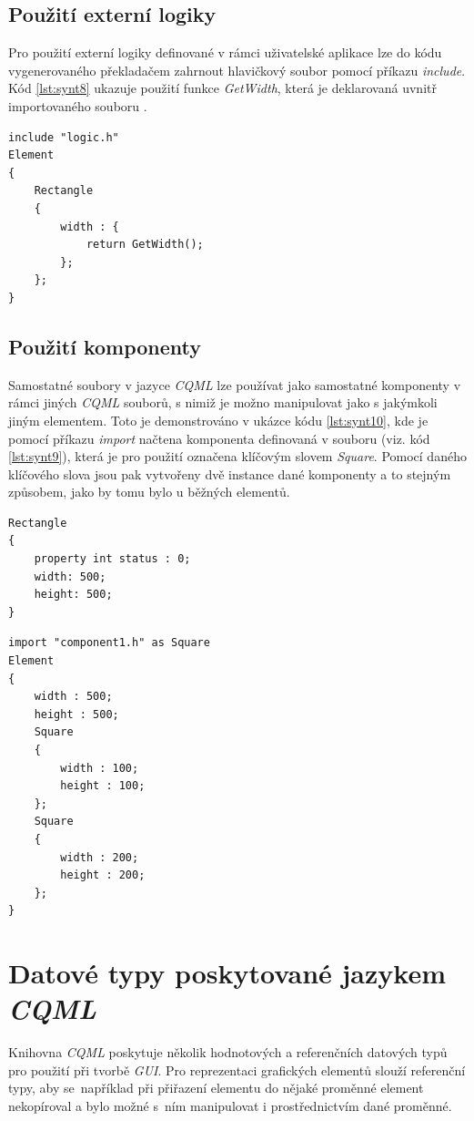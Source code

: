 \documentclass[11pt,twoside,a4paper]{book}
\begin{document}
\section{Použití externí logiky}
Pro použití externí logiky definované v rámci uživatelské aplikace lze do kódu vygenerovaného překladačem zahrnout hlavičkový soubor pomocí příkazu \textit{include}. Kód \ref{lst:synt8} ukazuje použití funkce \textit{GetWidth}, která je deklarovaná uvnitř importovaného souboru .
\begin{lstlisting}[frame=single,caption=Ukázka kódu používajícího externí funkci deklarovanou v hlavičkovém souboru.,label=lst:synt8]
include "logic.h"
Element
{
	Rectangle
	{
		width : {
			return GetWidth();
		};
	};
}
\end{lstlisting}


\section{Použití komponenty}
Samostatné soubory v jazyce \textit{CQML} lze používat jako samostatné komponenty v rámci jiných \textit{CQML} souborů, s nimiž je možno manipulovat jako s jakýmkoli jiným elementem. Toto je demonstrováno v ukázce kódu \ref{lst:synt10}, kde je pomocí příkazu \textit{import} načtena komponenta definovaná v souboru  (viz. kód \ref{lst:synt9}), která je pro použití označena klíčovým slovem \textit{Square}. Pomocí daného klíčového slova jsou pak vytvořeny dvě instance dané komponenty a to stejným způsobem, jako by tomu bylo u běžných elementů.
\begin{lstlisting}[float,frame=single,caption=Zdrojový soubor komponenty.,label=lst:synt9]
Rectangle
{
	property int status : 0;
	width: 500;
	height: 500;
}
\end{lstlisting}


\begin{lstlisting}[frame=single,caption=Ukázka použití komponenty z jiného souboru.,label=lst:synt10]
import "component1.h" as Square
Element
{
	width : 500;
	height : 500;
	Square
	{
		width : 100;
		height : 100;
	};
	Square
	{
		width : 200;
		height : 200;
	};
}
\end{lstlisting}



\chapter[Datové typy \textit{CQML}]{\label{CH:APC}Datové typy poskytované jazykem \textit{CQML}}
Knihovna \textit{CQML} poskytuje několik hodnotových a referenčních datových typů pro použití při tvorbě \textit{GUI}. Pro reprezentaci grafických elementů slouží referenční typy, aby se~například při přiřazení elementu do nějaké proměnné element nekopíroval a bylo možné s~ním manipulovat i prostřednictvím dané proměnné.
\end{document}
